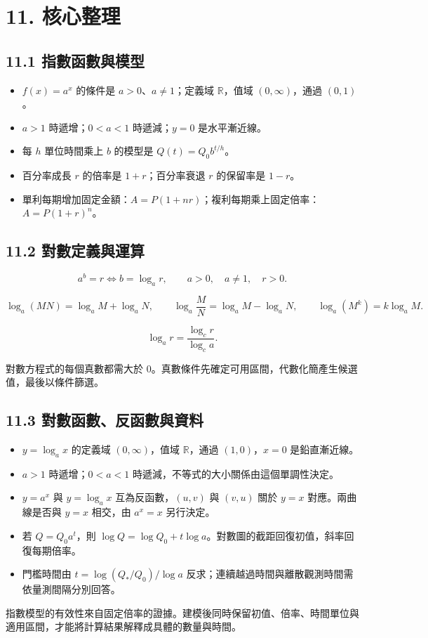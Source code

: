 \documentclass[11pt,a4paper]{article}
\providecommand{\tightlist}{%
  \setlength{\itemsep}{0pt}\setlength{\parskip}{0pt}}
\begin{document}
\section{11. 核心整理}\label{ux6838ux5fc3ux6574ux7406}

\subsection{11.1 指數函數與模型}\label{ux6307ux6578ux51fdux6578ux8207ux6a21ux578b}

\begin{itemize}
\tightlist
\item
  \(f(x)=a^x\) 的條件是 \(a>0\)、\(a\ne1\)；定義域 \(\mathbb R\)，值域 \((0,\infty)\)，通過 \((0,1)\)。
\item
  \(a>1\) 時遞增；\(0<a<1\) 時遞減；\(y=0\) 是水平漸近線。
\item
  每 \(h\) 單位時間乘上 \(b\) 的模型是 \(Q(t)=Q_0b^{t/h}\)。
\item
  百分率成長 \(r\) 的倍率是 \(1+r\)；百分率衰退 \(r\) 的保留率是 \(1-r\)。
\item
  單利每期增加固定金額：\(A=P(1+nr)\)；複利每期乘上固定倍率：\(A=P(1+r)^n\)。
\end{itemize}

\subsection{11.2 對數定義與運算}\label{ux5c0dux6578ux5b9aux7fa9ux8207ux904bux7b97}

\[
a^b=r\Longleftrightarrow b=\log_a r,\qquad
a>0,\quad a\ne1,\quad r>0.
\]

\[
\log_a(MN)=\log_aM+\log_aN,\qquad
\log_a\frac MN=\log_aM-\log_aN,\qquad
\log_a(M^k)=k\log_aM.
\]

\[
\log_a r=\frac{\log_c r}{\log_c a}.
\]

對數方程式的每個真數都需大於 \(0\)。真數條件先確定可用區間，代數化簡產生候選值，最後以條件篩選。

\subsection{11.3 對數函數、反函數與資料}\label{ux5c0dux6578ux51fdux6578ux53cdux51fdux6578ux8207ux8cc7ux6599}

\begin{itemize}
\tightlist
\item
  \(y=\log_a x\) 的定義域 \((0,\infty)\)，值域 \(\mathbb R\)，通過 \((1,0)\)，\(x=0\) 是鉛直漸近線。
\item
  \(a>1\) 時遞增；\(0<a<1\) 時遞減，不等式的大小關係由這個單調性決定。
\item
  \(y=a^x\) 與 \(y=\log_ax\) 互為反函數，\((u,v)\) 與 \((v,u)\) 關於 \(y=x\) 對應。兩曲線是否與 \(y=x\) 相交，由 \(a^x=x\) 另行決定。
\item
  若 \(Q=Q_0a^t\)，則 \(\log Q=\log Q_0+t\log a\)。對數圖的截距回復初值，斜率回復每期倍率。
\item
  門檻時間由 \(t=\log(Q_*/Q_0)/\log a\) 反求；連續越過時間與離散觀測時間需依量測間隔分別回答。
\end{itemize}

指數模型的有效性來自固定倍率的證據。建模後同時保留初值、倍率、時間單位與適用區間，才能將計算結果解釋成具體的數量與時間。
\end{document}
